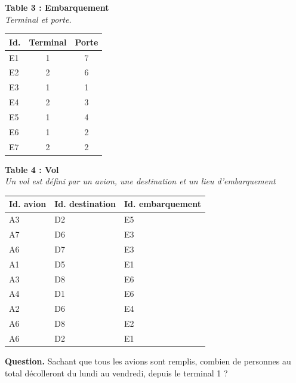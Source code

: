 \documentclass[class=report,crop=false, 12pt]{standalone}
\begin{document}
\begin{enigme}
\begin{center}
{\begin{minipage}{0.3\textwidth}
\textbf{Table 3 : Embarquement}\\
\emph{Terminal et porte.} \\

\begin{tabular}{|l|c|c|} \hline
\textbf{Id.} & \textbf{Terminal} & \textbf{Porte} \\ \hline\hline
E1 & 1 & 7 \\ \hline
E2 & 2 & 6 \\ \hline
E3 & 1 & 1 \\ \hline
E4 & 2 & 3 \\ \hline
E5 & 1 & 4 \\ \hline
E6 & 1 & 2 \\ \hline
E7 & 2 & 2 \\ \hline
\end{tabular}
\end{minipage}
}
\end{center}


\bigskip

\begin{center}
{\footnotesize
\textbf{Table 4 : Vol}\\
\emph{Un vol est défini par un avion, une destination et un lieu d'embarquement} \\

\begin{tabular}{|l|l|l|} \hline
\textbf{Id. avion} & \textbf{Id. destination} & \textbf{Id. embarquement}\\ \hline\hline
A3 & D2 & E5 \\ \hline
A7 & D6 & E3 \\ \hline
A6 & D7 & E3 \\ \hline
A1 & D5 & E1 \\ \hline
A3 & D8 & E6 \\ \hline
A4 & D1 & E6 \\ \hline
A2 & D6 & E4 \\ \hline
A6 & D8 & E2 \\ \hline
A6 & D2 & E1 \\ \hline
\end{tabular}
}
\end{center}
 
\bigskip

\textbf{Question.} Sachant que tous les avions sont remplis, combien de personnes au total décolleront du lundi au vendredi, depuis le terminal 1 ?


\end{enigme}
\end{document}
